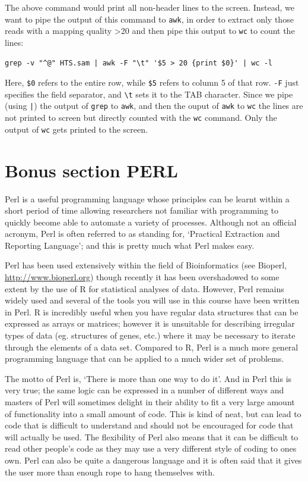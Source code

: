 \documentclass[11pt]{article}
\begin{document}
The above command would print all non-header lines to the
screen. Instead, we want to pipe the output of this command to \texttt{awk},
in order to extract only those reads with a mapping quality >20 and
then pipe this output to \texttt{wc} to count the lines:


\begin{verbatim}
grep -v "^@" HTS.sam | awk -F "\t" '$5 > 20 {print $0}' | wc -l
\end{verbatim}

Here, \texttt{\$0} refers to the entire row, while \texttt{\$5} refers to column 5 of
that row. \texttt{-F} just specifies the field separator, and
\texttt{\textbackslash{}t} sets it to the TAB character. Since we pipe (using \texttt{|}) the output of \texttt{grep} to
\texttt{awk}, and then the ouput of \texttt{awk} to \texttt{wc} the lines are not printed to screen but directly
counted with the \texttt{wc} command. Only the output of \texttt{wc} gets printed to the screen.
\section{Bonus section PERL}
\label{sec-5}

Perl is a useful programming language whose principles can be learnt
within a short period of time allowing researchers not familiar with
programming to quickly become able to automate a variety of processes.
Although not an official acronym, Perl is often referred to as standing
for, `Practical Extraction and Reporting Language'; and this is pretty much
what Perl makes easy.

Perl has been used extensively within the field of Bioinformatics (see
Bioperl, \href{http://www.bioperl.org}{http://www.bioperl.org}) though recently it has been overshadowed to
some extent by the use of R for statistical analyses of data. However,
Perl remains widely used and several of the tools you will use in this
course have been written in Perl. R is incredibly useful when you have
regular data structures that can be expressed as arrays or matrices;
however it is unsuitable for describing irregular types of data (eg.
structures of genes, etc.) where it may be necessary to iterate through
the elements of a data set. Compared to R, Perl is a much more general
programming language that can be applied to a much wider set of
problems.

The motto of Perl is, `There is more than one way to do it'. And in Perl
this is very true; the same logic can be expressed in a number of
different ways and masters of Perl will sometimes delight in their
ability to fit a very large amount of functionality into a small amount
of code. This is kind of neat, but can lead to code that is difficult to
understand and should not be encouraged for code that will
actually be used. The flexibility of Perl also means that it can be
difficult to read other people's code as they may use a very different
style of coding to ones own. Perl can also be quite a dangerous language
and it is often said that it gives the user more than enough rope to
hang themselves with.
\end{document}
